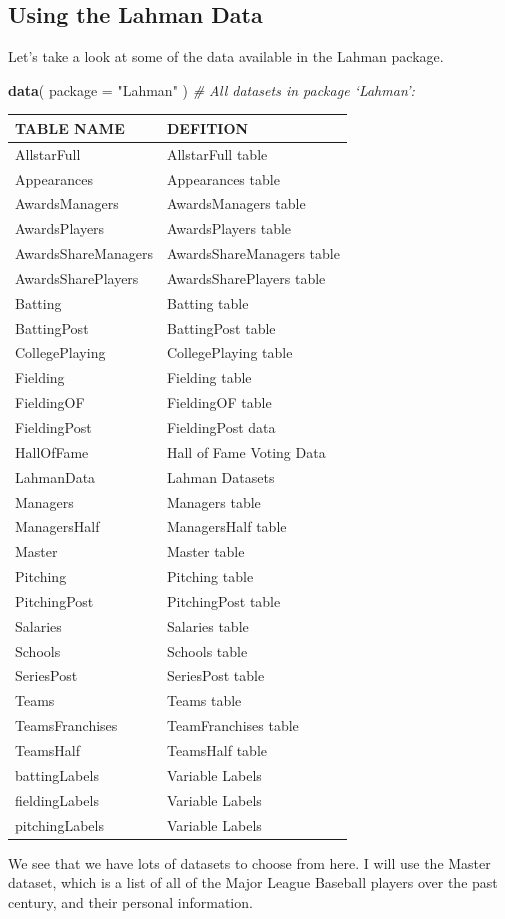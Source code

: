 \documentclass[]{book}
\newenvironment{Shaded}{\begin{snugshade}}{\end{snugshade}}
\newcommand{\CommentTok}[1]{\textcolor[rgb]{0.56,0.35,0.01}{\textit{#1}}}
\newcommand{\DataTypeTok}[1]{\textcolor[rgb]{0.13,0.29,0.53}{#1}}
\newcommand{\KeywordTok}[1]{\textcolor[rgb]{0.13,0.29,0.53}{\textbf{#1}}}
\newcommand{\NormalTok}[1]{#1}
\newcommand{\StringTok}[1]{\textcolor[rgb]{0.31,0.60,0.02}{#1}}
\theoremstyle{definition}
\theoremstyle{definition}
\theoremstyle{definition}
\theoremstyle{remark}
\begin{document}
\hypertarget{using-the-lahman-data}{%
\subsection{Using the Lahman Data}\label{using-the-lahman-data}}

Let's take a look at some of the data available in the Lahman package.

\begin{Shaded}
\begin{Highlighting}[]

\KeywordTok{data}\NormalTok{( }\DataTypeTok{package =} \StringTok{"Lahman"}\NormalTok{ ) }\CommentTok{# All datasets in package ‘Lahman’:}
\end{Highlighting}
\end{Shaded}

\begin{longtable}[]{@{}ll@{}}
\toprule
TABLE NAME & DEFITION\tabularnewline
\midrule
\endhead
AllstarFull & AllstarFull table\tabularnewline
Appearances & Appearances table\tabularnewline
AwardsManagers & AwardsManagers table\tabularnewline
AwardsPlayers & AwardsPlayers table\tabularnewline
AwardsShareManagers & AwardsShareManagers table\tabularnewline
AwardsSharePlayers & AwardsSharePlayers table\tabularnewline
Batting & Batting table\tabularnewline
BattingPost & BattingPost table\tabularnewline
CollegePlaying & CollegePlaying table\tabularnewline
Fielding & Fielding table\tabularnewline
FieldingOF & FieldingOF table\tabularnewline
FieldingPost & FieldingPost data\tabularnewline
HallOfFame & Hall of Fame Voting Data\tabularnewline
LahmanData & Lahman Datasets\tabularnewline
Managers & Managers table\tabularnewline
ManagersHalf & ManagersHalf table\tabularnewline
Master & Master table\tabularnewline
Pitching & Pitching table\tabularnewline
PitchingPost & PitchingPost table\tabularnewline
Salaries & Salaries table\tabularnewline
Schools & Schools table\tabularnewline
SeriesPost & SeriesPost table\tabularnewline
Teams & Teams table\tabularnewline
TeamsFranchises & TeamFranchises table\tabularnewline
TeamsHalf & TeamsHalf table\tabularnewline
battingLabels & Variable Labels\tabularnewline
fieldingLabels & Variable Labels\tabularnewline
pitchingLabels & Variable Labels\tabularnewline
\bottomrule
\end{longtable}

We see that we have lots of datasets to choose from here. I will use the
Master dataset, which is a list of all of the Major League Baseball
players over the past century, and their personal information.
\end{document}
